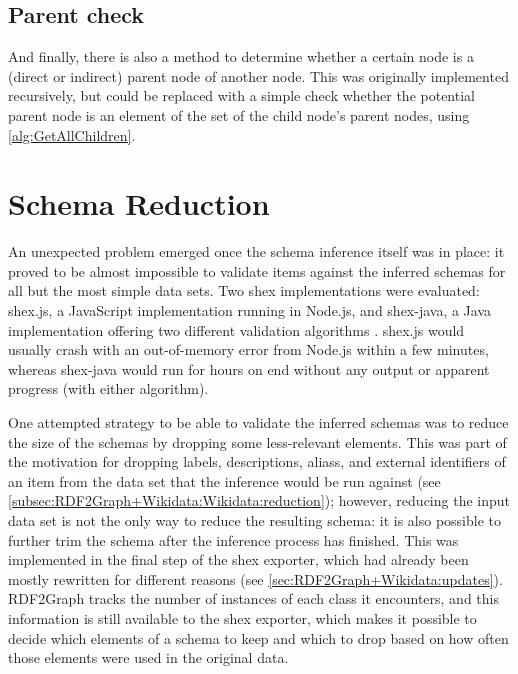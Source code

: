 \subsection{Parent check}
\label{subsec:RDF2Graph+Wikidata:cyclic-graph:IsParent}

And finally, there is also a method to determine whether a certain node is a (direct or indirect) parent node of another node.
This was originally implemented recursively,
but could be replaced with a simple check whether the potential parent node is an element of the set of the child node’s parent nodes,
using \cref{alg:GetAllChildren}.

\section{Schema Reduction}
\label{sec:RDF2Graph+Wikidata:schema-reduction}

An unexpected problem emerged once the \gls{schema} inference itself was in place: %
it proved to be almost impossible to validate \glspl{item} against the inferred schemas
for all but the most simple data sets.
Two \gls{shex} implementations were evaluated:
shex.js, %
a JavaScript implementation running in Node.js,
and shex-java,
a Java implementation offering two different validation algorithms \cite{boneva:hal-01590350}.
shex.js would usually crash with an out-of-memory error from Node.js within a few minutes,
whereas shex-java would run for hours on end without any output or apparent progress
(with either algorithm).

One attempted strategy to be able to validate the inferred \glspl{schema} %
was to reduce the size of the \glspl{schema} by dropping some less-relevant elements.
This was part of the motivation for dropping \glspl{label}, \glspl{description}, \glspl{alias}, and external identifiers of an \gls{item}
from the data set that the inference would be run against
(see \cref{subsec:RDF2Graph+Wikidata:Wikidata:reduction});
however, reducing the input data set is not the only way to reduce the resulting \gls{schema}:
it is also possible to further trim the \gls{schema} after the inference process has finished.
This was implemented in the final step of the \gls{shex} exporter, %
which had already been mostly rewritten for different reasons
(see \cref{sec:RDF2Graph+Wikidata:updates}).
\gls{RDF2Graph} tracks the number of instances of each class it encounters,
and this information is still available to the \gls{shex} exporter,
which makes it possible to decide which elements of a \gls{schema} to keep and which to drop
based on how often those elements were used in the original data. %


